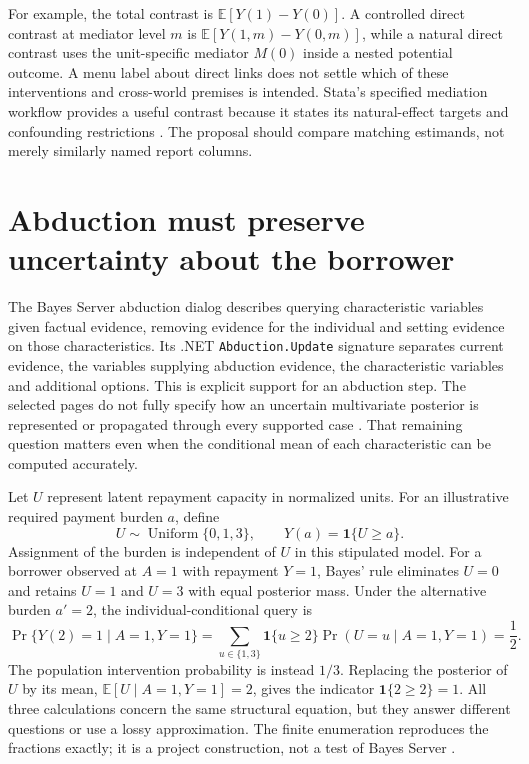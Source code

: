 For example, the total contrast is
$\mathbb E[Y(1)-Y(0)]$. A controlled direct contrast at mediator level $m$ is
$\mathbb E[Y(1,m)-Y(0,m)]$, while a natural direct contrast uses the
unit-specific mediator $M(0)$ inside a nested potential outcome. A menu label
about direct links does not settle which of these interventions and
cross-world premises is intended. Stata's specified mediation workflow
provides a useful contrast because it states its natural-effect targets and
confounding restrictions \citep{exec13_ci_stata_mediate}. The proposal should
compare matching estimands, not merely similarly named report columns.

\section{Abduction must preserve uncertainty about the borrower}

The Bayes Server abduction dialog describes querying characteristic variables
given factual evidence, removing evidence for the individual and setting
evidence on those characteristics. Its .NET \texttt{Abduction.Update} signature
separates current evidence, the variables supplying abduction evidence, the
characteristic variables and additional options. This is explicit support for
an abduction step. The selected pages do not fully specify how an uncertain
multivariate posterior is represented or propagated through every supported
case \citep{exec14_ci_abduction,exec14_ci_api_abduction}. That remaining
question matters even when the conditional mean of each characteristic can
be computed accurately.

Let $U$ represent latent repayment capacity in normalized units. For an
illustrative required payment burden $a$, define
\[
 U\sim\operatorname{Uniform}\{0,1,3\},\qquad
 Y(a)=\mathbf 1\{U\geq a\}.
\]
Assignment of the burden is independent of $U$ in this stipulated model.
For a borrower observed at $A=1$ with repayment $Y=1$, Bayes' rule eliminates
$U=0$ and retains $U=1$ and $U=3$ with equal posterior mass. Under the
alternative burden $a'=2$, the individual-conditional query is
\[
 \Pr\{Y(2)=1\mid A=1,Y=1\}
 =\sum_{u\in\{1,3\}}\mathbf 1\{u\geq2\}
   \Pr(U=u\mid A=1,Y=1)=\frac12.
\]
The population intervention probability is instead $1/3$. Replacing the
posterior of $U$ by its mean, $\mathbb E[U\mid A=1,Y=1]=2$, gives the
indicator $\mathbf 1\{2\geq2\}=1$. All three calculations concern the
same structural equation, but they answer different questions or use a lossy
approximation. The finite enumeration reproduces the fractions exactly; it
is a project construction, not a test of Bayes Server
\citep{exec14_ci_exact}.

